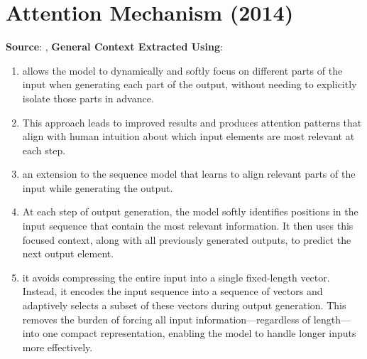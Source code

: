 \chapter{Attention Mechanism (2014)}

\begin{center}
    \textbf{Source}: \cite{adv-ml-tech/paper/arxiv.org/1409.0473},
    \textbf{General Context Extracted Using}: \cite{common/online/chatgpt}
\end{center}


\begin{enumerate}
    \item allows the model to dynamically and softly focus on different parts of the input when generating each part of the output, without needing to explicitly isolate those parts in advance.
    \hfill \cite{adv-ml-tech/paper/arxiv.org/1409.0473, common/online/chatgpt}

    \item This approach leads to improved results and produces attention patterns that align with human intuition about which input elements are most relevant at each step.
    \hfill \cite{adv-ml-tech/paper/arxiv.org/1409.0473, common/online/chatgpt}

    \item an extension to the sequence model that learns to align relevant parts of the input while generating the output.
    \hfill \cite{adv-ml-tech/paper/arxiv.org/1409.0473, common/online/chatgpt}

    \item At each step of output generation, the model softly identifies positions in the input sequence that contain the most relevant information.
    It then uses this focused context, along with all previously generated outputs, to predict the next output element.
    \hfill \cite{adv-ml-tech/paper/arxiv.org/1409.0473, common/online/chatgpt}

    \item it avoids compressing the entire input into a single fixed-length vector. Instead, it encodes the input sequence into a sequence of vectors and adaptively selects a subset of these vectors during output generation.
    This removes the burden of forcing all input information—regardless of length—into one compact representation, enabling the model to handle longer inputs more effectively.
    \hfill \cite{adv-ml-tech/paper/arxiv.org/1409.0473, common/online/chatgpt}


\end{enumerate}


